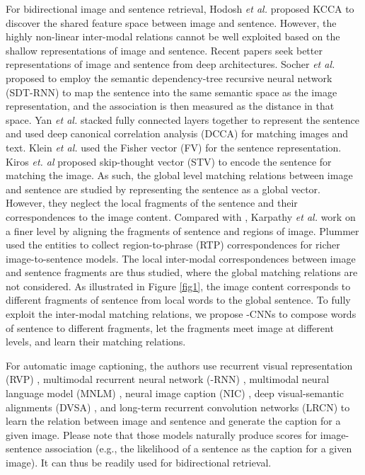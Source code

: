 \documentclass[10pt,twocolumn,letterpaper]{article}
\begin{document}
For bidirectional image and sentence retrieval, Hodosh \textit{et al.} \cite{hodosh_jair2013}  proposed KCCA to discover the shared feature space between image and sentence. However, the highly non-linear inter-modal relations cannot be well exploited based on the shallow representations of image and sentence.
Recent papers seek better representations of image and sentence from deep architectures. Socher \textit{et al.}  \cite{socher_tacl2014} proposed to employ the semantic dependency-tree recursive neural network (SDT-RNN) to map the sentence into the same semantic space as the image representation, and the association is then measured as the distance in that space. Yan \textit{et al.} \cite{yan_cvpr2015} stacked fully connected layers together to represent the sentence and used deep canonical correlation analysis (DCCA) for matching images and text. Klein \textit{et al.} \cite{klein_cvpr2015} used the Fisher vector (FV) for the sentence representation. Kiros \textit{et. al} \cite{kiros_2015} proposed skip-thought vector (STV) to encode the sentence for matching the image. As such, the global level matching relations between image and sentence are studied by representing the sentence as a global vector. However, they neglect the local fragments of the sentence and their correspondences to the image content. Compared with \cite{socher_tacl2014}, Karpathy \textit{et al.} \cite{karpathy_2014} work on a finer level by aligning the fragments of sentence and regions of image. Plummer  \cite{plummer_2015} used the entities to collect region-to-phrase (RTP) correspondences for richer image-to-sentence models. The local inter-modal correspondences between image and sentence fragments are thus studied, where the global matching relations are not considered. As illustrated in Figure \ref{fig1}, the image content corresponds to different fragments of sentence from local words to the global sentence. To fully exploit the inter-modal matching relations,  we propose -CNNs to compose words of sentence to different fragments, let the fragments meet image at different levels, and learn their matching relations.

For automatic image captioning,  the authors use recurrent visual representation (RVP) \cite{chen_2014}, multimodal recurrent neural network (-RNN) \cite{mao_2014,mao_iclr_2015}, multimodal neural language model (MNLM) \cite{kiros_icml2014,kiros_2014}, neural image caption (NIC) \cite{vinyals_2014}, deep visual-semantic alignments (DVSA) \cite{karpathy_dvsa_2014}, and long-term recurrent convolution networks (LRCN) \cite{donahue_2014} to learn the relation between image and sentence and generate the caption for a given image. Please note that those models naturally produce scores for image-sentence association (e.g., the likelihood of a sentence as the caption for a given image). It can thus be readily used for bidirectional retrieval.
\end{document}
